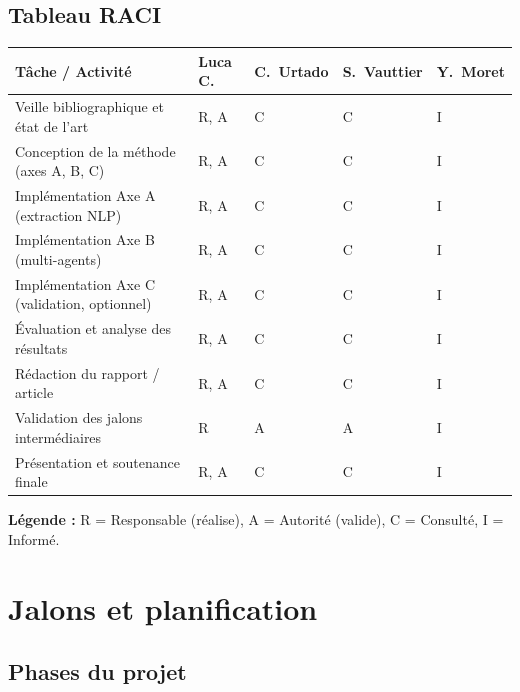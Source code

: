 \documentclass[12pt, a4paper]{article}
\begin{document}
\subsection{Tableau RACI}
\vspace{0.5em}
\begin{center}
\begin{tabularx}{\linewidth}{|>{\raggedright\arraybackslash}X|C{1.6cm}|C{1.9cm}|C{1.9cm}|C{1.6cm}|}
  \hline
  \textbf{Tâche / Activité}
    & \textbf{Luca C.}
    & \textbf{C.~Urtado}
    & \textbf{S.~Vauttier}
    & \textbf{Y.~Moret} \\
  \hline
  Veille bibliographique et état de l'art        & R, A & C & C & I \\
  \hline
  Conception de la méthode (axes A, B, C)        & R, A & C & C & I \\
  \hline
  Implémentation Axe A (extraction NLP)          & R, A & C & C & I \\
  \hline
  Implémentation Axe B (multi-agents)            & R, A & C & C & I \\
  \hline
  Implémentation Axe C (validation, optionnel)   & R, A & C & C & I \\
  \hline
  Évaluation et analyse des résultats            & R, A & C & C & I \\
  \hline
  Rédaction du rapport / article                 & R, A & C & C & I \\
  \hline
  Validation des jalons intermédiaires           & R    & A & A & I \\
  \hline
  Présentation et soutenance finale              & R, A & C & C & I \\
  \hline
\end{tabularx}
\end{center}
\vspace{0.4em}
{\small \textbf{Légende :} R = Responsable (réalise), A = Autorité (valide), C = Consulté,
I = Informé.}

\section{Jalons et planification}

\subsection{Phases du projet}
\end{document}
